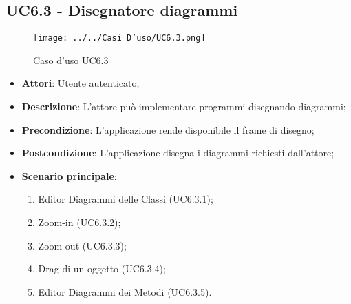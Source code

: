 \subsection{UC6.3 - Disegnatore diagrammi} 
\label{ssec:UC6.3} 
\begin{figure}[h!] 
\centering 
\texttt{[image: ../../Casi D'uso/UC6.3.png]} 
\caption{Caso d'uso UC6.3} 
 \end{figure} 
\begin{itemize} 
\item \textbf{Attori}: Utente autenticato;
\item \textbf{Descrizione}: L'attore può implementare programmi disegnando diagrammi;
\item \textbf{Precondizione}: L'applicazione rende disponibile il frame di disegno;
\item \textbf{Postcondizione}: L'applicazione disegna i diagrammi richiesti dall'attore;
\item \textbf{Scenario principale}: \begin{enumerate}\item Editor Diagrammi delle Classi (UC6.3.1);\item Zoom-in (UC6.3.2);\item Zoom-out (UC6.3.3);\item Drag di un oggetto (UC6.3.4);\item Editor Diagrammi dei Metodi (UC6.3.5). 
 \end{enumerate}
\end{itemize} 
\newpage
